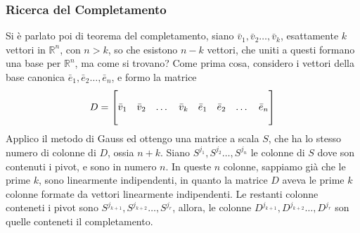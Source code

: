 \documentclass[12pt, letterpaper]{article}
\newcommand{\R}{{\mathbb R}}
\newcommand{\ve}{{\bar v}}
\begin{document}
\subsubsection{Ricerca del Completamento}
Si è parlato poi di teorema del completamento, siano \(\ve_1,\ve_2\dots,\ve_k\), esattamente \(k\) vettori in \(\R^n\), con 
\(n>k\), so che esistono \(n-k\) vettori, che uniti a questi formano una base per \(\R^n\), ma come si trovano? 
Come prima cosa, considero i vettori della base canonica \(\bar e_1,\bar e_2\dots,\bar e_n\), e formo la matrice 
$$D=\begin{bmatrix}
    \hphantom{}&\hphantom{}&\hphantom{}&\hphantom{}&\hphantom{}&\hphantom{}&\hphantom{}\\
    \bar v_1&\bar v_2&\dots&\bar v_k&\bar e_1&\bar e_2&\dots&\bar e_n\\
    \hphantom{}&\hphantom{}&\hphantom{}&\hphantom{}&\hphantom{}&\hphantom{}&\hphantom{}
\end{bmatrix}$$
Applico il metodo di Gauss ed ottengo una matrice a scala \(S\), che ha lo stesso numero di colonne di \(D\), ossia \(n+k\).
Siano \(S^{j_1},S^{j_2}\dots,S^{j_n}\) le colonne di \(S\) dove son contenuti i pivot, e sono in numero \(n\).
In queste \(n\) colonne, sappiamo già che le prime \(k\), sono linearmente indipendenti, in quanto la matrice \(D\) aveva 
le prime \(k\) colonne formate da vettori linearmente indipendenti. Le restanti colonne conteneti i pivot sono 
\(S^{j_{k+1}},S^{j_{k+2}}\dots,S^{j_{r}}\), allora, le colonne \(D^{j_{k+1}},D^{j_{k+2}}\dots,D^{j_{r}}\) son quelle 
conteneti il completamento.
\end{document}
